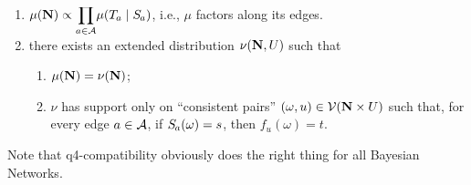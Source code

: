 \documentclass{article}
\begin{document}
\begin{defn}
\begin{enumerate}[label=\textbullet~\textit{q\arabic*-compatible} with $\Ed$ iff, labelwidth=-10em]
            \item %
            $\displaystyle 
                \mu(\mat N) \propto \smash{\prod_{a \in \Ar}} \mu( \Tgt a \mid \Src a)$, 
                i.e., $\mu$ factors along its edges. 
    
            \item 
                there exists an extended distribution $\nu(\mathbf{N}, U)$ such that
                \begin{enumerate}[label=(\alph*)]
                    \item $\mu(\mathbf{N}) = \nu(\mathbf{N})$;
                    \item $\nu$ has support only on ``consistent pairs'' $(\omega, u) \in \mathcal V(\mathbf{N} \times U)$
                        such that, for every edge $a \in \mathcal A$, 
                        if $\Src a (\omega) = s$, then $f_u(\omega) = t$. 
                \end{enumerate}
            
        \end{enumerate}
    \end{defn}
    
    Note that q4-compatibility obviously does the right thing for all Bayesian Networks.

    
    
\end{document}
